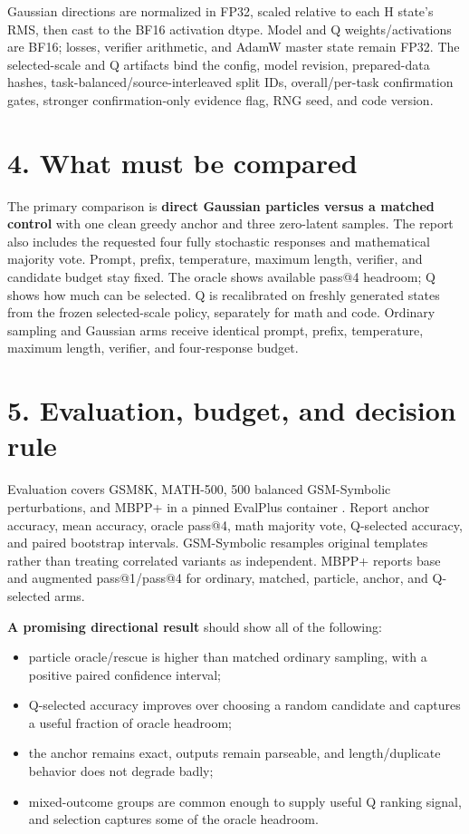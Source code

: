 \documentclass[10pt]{article}
\begin{document}
Gaussian directions are normalized in FP32, scaled relative to each H state's
RMS, then cast to the BF16 activation dtype. Model and Q weights/activations are
BF16; losses, verifier arithmetic, and AdamW master state remain FP32. The
selected-scale and Q artifacts bind the config, model revision, prepared-data
hashes, task-balanced/source-interleaved split IDs, overall/per-task confirmation
gates, stronger confirmation-only evidence flag, RNG seed, and code version.

\newpage
\small
\section*{4. What must be compared}

The primary comparison is \textbf{direct Gaussian particles versus a matched control}
with one clean greedy anchor and three zero-latent samples.  The report also
includes the requested four fully stochastic responses and mathematical
majority vote.  Prompt, prefix, temperature, maximum length, verifier, and
candidate budget stay fixed.  The oracle shows available pass@4 headroom; Q
shows how much can be selected. Q is recalibrated on freshly generated states
from the frozen selected-scale policy, separately for math and code. Ordinary
sampling and Gaussian arms receive identical prompt, prefix, temperature,
maximum length, verifier, and four-response budget.

\section*{5. Evaluation, budget, and decision rule}

Evaluation covers GSM8K, MATH-500, 500 balanced GSM-Symbolic perturbations, and
MBPP+ in a pinned EvalPlus container \cite{evalplus}.  Report anchor accuracy,
mean accuracy, oracle pass@4, math majority vote, Q-selected accuracy, and paired
bootstrap intervals.  GSM-Symbolic resamples original templates rather than
treating correlated variants as independent.  MBPP+ reports base and augmented
pass@1/pass@4 for ordinary, matched, particle, anchor, and Q-selected arms.

\textbf{A promising directional result} should show all of the following:
\begin{itemize}
  \item particle oracle/rescue is higher than matched ordinary sampling, with a
  positive paired confidence interval;
  \item Q-selected accuracy improves over choosing a random candidate and
  captures a useful fraction of oracle headroom;
  \item the anchor remains exact, outputs remain parseable, and length/duplicate
  behavior does not degrade badly;
  \item mixed-outcome groups are common enough to supply useful Q ranking
  signal, and selection captures some of the oracle headroom.
\end{itemize}
\end{document}
